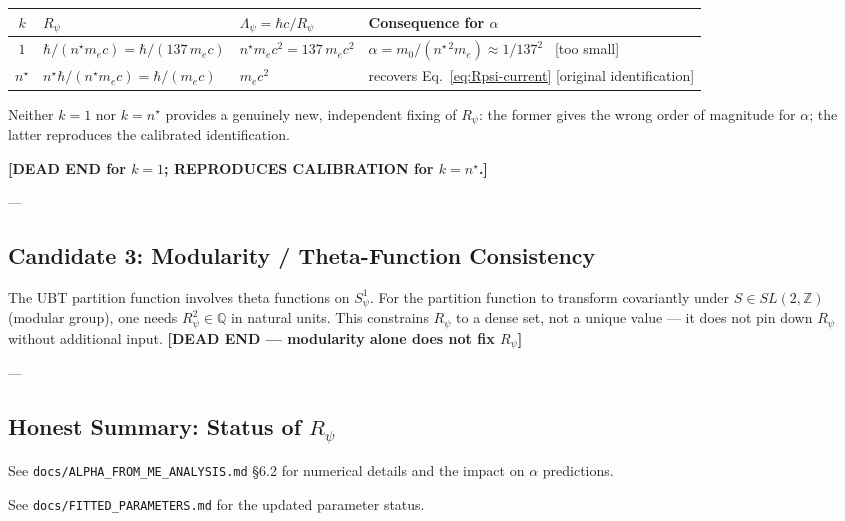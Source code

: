 \begin{center}
\begin{tabular}{|c|l|l|l|}
\hline
$k$ & $R_\psi$ & $\Lambda_\psi = \hbar c/R_\psi$ & Consequence for $\alpha$ \\
\hline
$1$ & $\hbar/(n^\star m_e c)=\hbar/(137\,m_e c)$ & $n^\star m_e c^2 = 137\,m_e c^2$ &
  $\alpha = m_0/(n^{\star\,2} m_e) \approx 1/137^2$ \ [too small] \\
$n^\star$ & $n^\star\hbar/(n^\star m_e c)=\hbar/(m_e c)$ & $m_e c^2$ &
  recovers Eq.~\eqref{eq:Rpsi-current} [original identification] \\
\hline
\end{tabular}
\end{center}

Neither $k=1$ nor $k=n^\star$ provides a genuinely new, independent fixing of $R_\psi$:
the former gives the wrong order of magnitude for $\alpha$; the latter reproduces
the calibrated identification.

\textbf{[DEAD END for $k=1$; REPRODUCES CALIBRATION for $k=n^\star$.]}

---

\subsection{Candidate 3: Modularity / Theta-Function Consistency}

The UBT partition function involves theta functions on $S^1_\psi$.  For the partition
function to transform covariantly under $S\in SL(2,\mathbb{Z})$ (modular group), one
needs $R_\psi^2 \in \mathbb{Q}$ in natural units.  This constrains $R_\psi$ to a
dense set, not a unique value — it does not pin down $R_\psi$ without additional
input.  \textbf{[DEAD END — modularity alone does not fix $R_\psi$]}

---

\subsection{Honest Summary: Status of $R_\psi$}

\begin{center}
\end{center}

\noindent See \texttt{docs/ALPHA\_FROM\_ME\_ANALYSIS.md} §6.2 for numerical details
and the impact on $\alpha$ predictions.

\noindent See \texttt{docs/FITTED\_PARAMETERS.md} for the updated parameter status.
